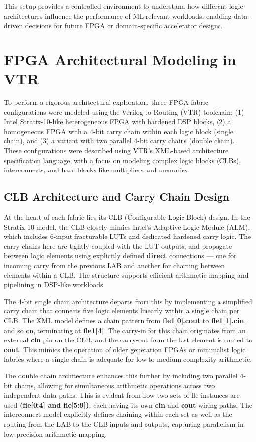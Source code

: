 This setup provides a controlled environment to understand how different logic architectures influence the performance of ML-relevant workloads, enabling data-driven decisions for future FPGA or domain-specific accelerator designs.

\section{FPGA Architectural Modeling in VTR}
To perform a rigorous architectural exploration, three FPGA fabric configurations were modeled using the Verilog-to-Routing (VTR) toolchain: (1) Intel Stratix-10-like heterogeneous FPGA with hardened DSP blocks, (2) a homogeneous FPGA with a 4-bit carry chain within each logic block (single chain), and (3) a variant with two parallel 4-bit carry chains (double chain). These configurations were described using VTR’s XML-based architecture specification language, with a focus on modeling complex logic blocks (CLBs), interconnects, and hard blocks like multipliers and memories.

\subsection{CLB Architecture and Carry Chain Design}
At the heart of each fabric lies its CLB (Configurable Logic Block) design. In the Stratix-10 model, the CLB closely mimics Intel’s Adaptive Logic Module (ALM), which includes 6-input fracturable LUTs and dedicated hardened carry logic. The carry chains here are tightly coupled with the LUT outputs, and propagate between logic elements using explicitly defined \textbf{direct} connections — one for incoming carry from the previous LAB and another for chaining between elements within a CLB. The structure supports efficient arithmetic mapping and pipelining in DSP-like workloads

The 4-bit single chain architecture departs from this by implementing a simplified carry chain that connects five logic elements linearly within a single chain per CLB. The XML model defines a chain pattern from \textbf{fle1[0].cout} to \textbf{fle1[1].cin}, and so on, terminating at \textbf{fle1[4]}. The carry-in for this chain originates from an external \textbf{cin} pin on the CLB, and the carry-out from the last element is routed to \textbf{cout}. This mimics the operation of older generation FPGAs or minimalist logic fabrics where a single chain is adequate for low-to-medium complexity arithmetic.

The double chain architecture enhances this further by including two parallel 4-bit chains, allowing for simultaneous arithmetic operations across two independent data paths. This is evident from how two sets of fle instances are used \textbf{(fle[0:4] and fle[5:9])}, each having its own \textbf{cin} and \textbf{cout} wiring paths. The interconnect model explicitly defines chaining within each set as well as the routing from the LAB to the CLB inputs and outputs, capturing parallelism in low-precision arithmetic mapping.

